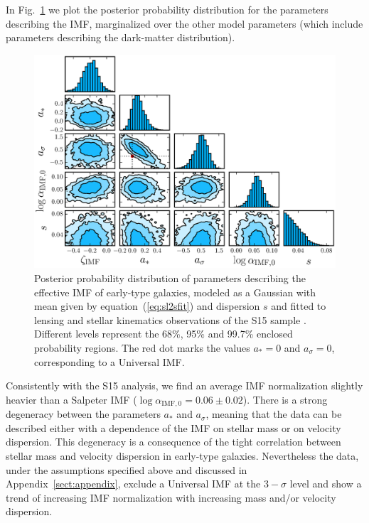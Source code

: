 \documentclass[usenatbib]{mnras}
\def\Fref#1{Fig.~\ref{#1}\xspace}
\def\Eref#1{equation~(\ref{#1})\xspace}
\begin{document}
In \Fref{fig:sl2scorner} we plot the posterior probability distribution for the parameters describing the IMF, marginalized over the other model parameters (which include parameters describing the dark-matter distribution).
%
\begin{figure}
 \includegraphics[width=\textwidth]{imf_pars_nfw_msps_sigma.eps}
 \caption{Posterior probability distribution of parameters describing
   the effective IMF of early-type galaxies, modeled as a Gaussian with mean given by \Eref{eq:sl2sfit} and dispersion $s$ and fitted to 
   lensing and stellar kinematics observations of the S15 sample
   . Different levels represent the 68\%, 95\% and
   99.7\% enclosed probability regions.
The red dot marks the values $a_*=0$ and $a_\sigma=0$, corresponding to a Universal IMF.
}
 \label{fig:sl2scorner}
\end{figure}
%
Consistently with the S15 analysis, we find an average IMF
normalization slightly heavier than a Salpeter IMF
($\log{\alpha_{\mathrm{IMF},0}} = 0.06\pm0.02$). There is a strong
degeneracy between the parameters $a_*$ and $a_\sigma$, meaning that
the data can be described either with a dependence of the IMF on
stellar mass or on velocity dispersion. This degeneracy is a
consequence of the tight correlation between stellar mass and velocity
dispersion in early-type galaxies.  Nevertheless the data, under the
assumptions specified above and discussed in
Appendix~\ref{sect:appendix}, exclude a Universal IMF at the
$3-\sigma$ level and show a trend of increasing IMF normalization with
increasing mass and/or velocity dispersion.
\end{document}
